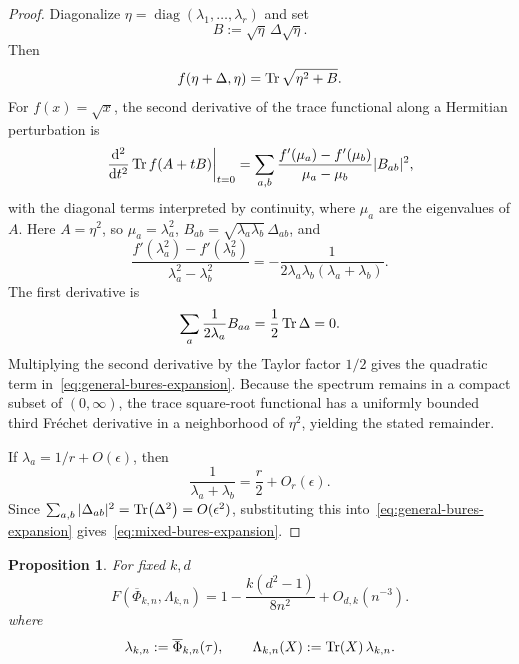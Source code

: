 \documentclass[10pt,twocolumn,superscriptaddress,aps,amsmath,amssymb,citeautoscript,floatfix,prx]{revtex4-2}
\theoremstyle{plain}
\theoremstyle{plain}
\theoremstyle{plain}
\theoremstyle{plain}
\theoremstyle{plain}
\theoremstyle{plain}
\theoremstyle{plain}
\newtheorem{smproposition}[smtheorem]{Proposition}
\theoremstyle{definition}
\theoremstyle{plain}
\begin{document}
\begin{appendix}
\begin{proof}
Diagonalize $\eta=\operatorname{diag}(\lambda_1,\ldots,\lambda_r)$ and set
\[
  B:=\sqrt\eta\,\Delta\sqrt\eta.
\]
Then
\[
  f(\eta+\Delta,\eta)
  =\Tr\sqrt{\eta^2+B}.
\]
For $f(x)=\sqrt x$, the second derivative of the trace functional along a Hermitian perturbation is
\[
  \left.\frac{\dd^2}{\dd t^2}\Tr f(A+tB)\right|_{t=0}
  =\sum_{a,b}
  \frac{f'(\mu_a)-f'(\mu_b)}{\mu_a-\mu_b}|B_{ab}|^2,
\]
with the diagonal terms interpreted by continuity, where $\mu_a$ are the eigenvalues of $A$. 
Here $A=\eta^2$, so $\mu_a=\lambda_a^2$, $B_{ab}=\sqrt{\lambda_a\lambda_b}\,\Delta_{ab}$, and
\[
  \frac{f'(\lambda_a^2)-f'(\lambda_b^2)}
       {\lambda_a^2-\lambda_b^2}
  =-\frac1{2\lambda_a\lambda_b(\lambda_a+\lambda_b)}.
\]
The first derivative is
\[
  \sum_a\frac1{2\lambda_a}B_{aa}
  =\frac12\Tr\Delta=0.
\]
Multiplying the second derivative by the Taylor factor $1/2$ gives the quadratic term in~\eqref{eq:general-bures-expansion}. 
Because the spectrum remains in a compact subset of $(0,\infty)$, the trace square-root functional has a uniformly bounded third Fr\'echet derivative in a neighborhood of $\eta^2$, 
yielding the stated remainder.

If $\lambda_a=1/r+O(\epsilon)$, then
\[
  \frac1{\lambda_a+\lambda_b}=\frac r2+O_r(\epsilon).
\]
Since $\sum_{a,b}|\Delta_{ab}|^2=\Tr(\Delta^2)=O(\epsilon^2)$, substituting this into~\eqref{eq:general-bures-expansion} gives~\eqref{eq:mixed-bures-expansion}.
\end{proof}

\begin{smproposition}\label{prop:k-loc_fidelity}
For fixed $k, d$
\begin{equation}
\label{eq:mean-fidelity}
  F(\overline\Phi_{k,n},\Lambda_{k,n})
  =1-\frac{k(d^2-1)}{8n^2}+O_{d,k}(n^{-3}).
\end{equation}
where 
\begin{equation}
\label{eq:lambda-kn}
  \lambda_{k,n}:=\overline\Phi_{k,n}(\tau),
  \qquad
  \Lambda_{k,n}(X):=\Tr(X)\,\lambda_{k,n}.
\end{equation}
\end{smproposition}


\end{appendix}
\end{document}
